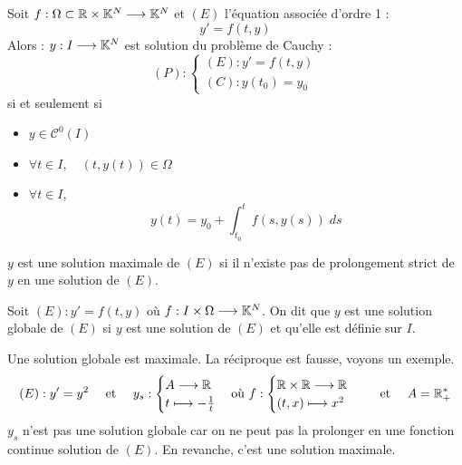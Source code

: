 \begin{proposition}[Exercice]
    Soit $f : \Omega \subset \mathbb{R} \times \mathbb{K}^N \longrightarrow \mathbb{K}^N$ et $(E)$ l'équation associée d'ordre 1 :
        \[ y' = f(t,y) \] 
    Alors : $y : I \longrightarrow \mathbb{K}^N$ est solution du problème de Cauchy :
        \[ (P) : 
            \begin{cases}
                (E) : y' = f(t,y) \\ 
                (C) : y(t_0) = y_0 
            \end{cases}
        \] 
    si et seulement si 
        \begin{itemize}
            \item $y \in \mathcal{C}^0(I)$ 
            \item $ \forall t \in I, \quad (t,y(t)) \in \Omega $ 
            \item $ \forall t \in I$, 
                \[ y(t) = y_0 + \int_{t_0}^{t} f(s,y(s)) \; ds \] 
        \end{itemize}
\end{proposition}

\begin{definition}
    $y$ est une solution maximale de $(E)$ si il n'existe pas de prolongement strict de $y$ en une solution de $(E)$. 
\end{definition}

\begin{definition}
    Soit $(E) : y' = f(t,y)$ où $f : I \times \Omega \longrightarrow \mathbb{K}^N$. 
    On dit que $y$ est une solution globale de $(E)$ si $y$ est une solution de $(E)$ et qu'elle est définie sur $I$.
\end{definition}

\begin{remark}
    Une solution globale est maximale. La réciproque est fausse, voyons un exemple. 
        \[ (E) : y' = y^2 \quad \text{ et } \quad y_s :
            \begin{cases}
                A \longrightarrow \mathbb{R} \\ 
                t \longmapsto - \frac{1}{t}
            \end{cases}
            \text{où } f: 
            \begin{cases}
                \mathbb{R} \times \mathbb{R} \longrightarrow \mathbb{R} \\ 
                (t,x) \longmapsto x^2
            \end{cases}
            \quad \text{ et } \quad A = \mathbb{R}_+^* \] 
    $y_s$ n'est pas une solution globale car on ne peut pas la prolonger en une fonction continue solution de $(E)$. 
    En revanche, c'est une solution maximale. 
\end{remark}

